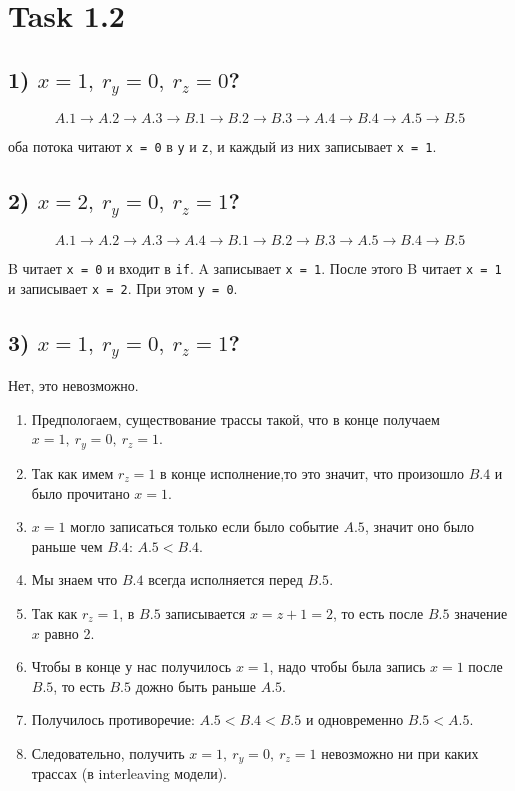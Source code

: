\documentclass{article}
\begin{document}
\small

\section*{Task 1.2}

\subsection*{1) $x=1,\ r_y=0,\ r_z=0$?}

\[
A.1 \to A.2 \to A.3 \to B.1 \to B.2 \to B.3 \to A.4 \to B.4 \to A.5 \to B.5
\]

оба потока читают \texttt{x = 0} в \texttt{y} и \texttt{z}, и каждый из них записывает \texttt{x = 1}.

\subsection*{2) $x=2,\ r_y=0,\ r_z=1$?}

\[
A.1 \to A.2 \to A.3 \to A.4 \to B.1 \to B.2 \to B.3 \to A.5 \to B.4 \to B.5
\]

B читает \texttt{x = 0} и входит в \texttt{if}. A записывает \texttt{x = 1}. После этого B читает \texttt{x = 1} и записывает \texttt{x = 2}.
При этом \texttt{y = 0}.

\subsection*{3) $x=1,\ r_y=0,\ r_z=1$?}

Нет, это невозможно.

\begin{enumerate}
\item Предпологаем, существование трассы такой, что в конце получаем $x=1,\ r_y=0,\ r_z=1$.
\item Так как имем $r_z=1$ в конце исполнение,то это значит, что произошло $B.4$ и было прочитано $x=1$.
\item $x=1$ могло записаться только если было событие $A.5$, значит оно было раньше чем $B.4$: $A.5 < B.4$.
\item Мы знаем что $B.4$ всегда исполняется перед $B.5$.
\item Так как $r_z=1$, в $B.5$ записывается $x=z+1=2$, то есть после $B.5$ значение $x$ равно 2.
\item Чтобы в конце у нас получилось $x=1$, надо чтобы была запись $x=1$ после $B.5$, то есть $B.5$ дожно быть раньше $A.5$.
\item Получилось противоречие: $A.5 < B.4 < B.5$ и одновременно $B.5 < A.5$.
\item Следовательно, получить $x=1,\ r_y=0,\ r_z=1$ невозможно ни при каких трассах (в interleaving модели).
\end{enumerate}
\end{document}
